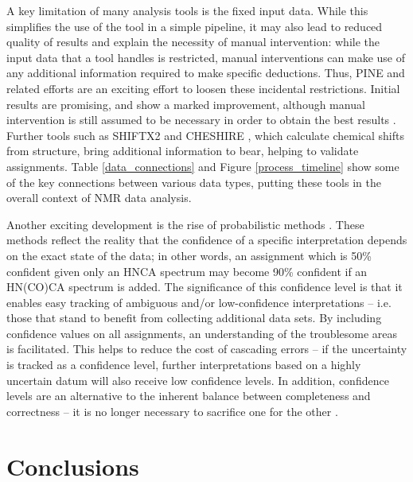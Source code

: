 A key limitation of many analysis tools is the fixed input data.  While
this simplifies the use of the tool in a simple pipeline, it may also lead
to reduced quality of results and explain the necessity of manual intervention:  
while the input data that a tool handles is restricted, manual interventions can
make use of any additional information required to make specific deductions. 
Thus, PINE and related efforts  
are an exciting effort to loosen these incidental restrictions.  Initial 
results are promising, and show a marked improvement, although manual 
intervention is still assumed to be necessary in order to obtain the best 
results \cite{pine}.  Further tools such as SHIFTX2 and CHESHIRE 
\cite{shiftx2, cheshire}, which calculate chemical shifts from structure,  
bring additional information to bear, helping to validate assignments.
Table \ref{data_connections} and Figure \ref{process_timeline} show some
of the key connections between various data types, putting these tools in
the overall context of NMR data analysis.

Another exciting development is the rise of probabilistic methods 
\cite{saga, pine}.  These methods reflect the reality that the 
confidence of a specific interpretation depends on the exact state of the 
data; in other words, an assignment which is 50\% confident given only an 
HNCA spectrum may become 90\% confident if an HN(CO)CA spectrum is added.  
The significance of this confidence level is that it enables easy tracking 
of ambiguous and/or low-confidence interpretations -- i.e. those that stand 
to benefit from collecting additional data sets.  By including confidence 
values on all assignments, an understanding of the troublesome areas is 
facilitated.  This helps to reduce the cost of cascading errors -- if the 
uncertainty is tracked as a confidence level, further interpretations based 
on a highly uncertain datum will also receive low confidence levels.  In 
addition, confidence levels are an alternative to the inherent balance 
between completeness and correctness -- it is no longer necessary to 
sacrifice one for the other \cite{autoassign2001, pine}.


\section{Conclusions}

